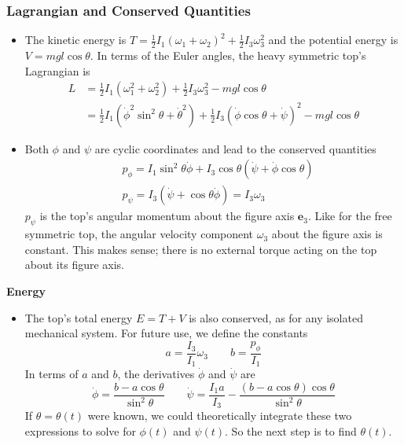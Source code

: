 \documentclass[11pt, a4paper]{article}
\newcommand{\e}{\mathbf{e}} %
\begin{document}
\subsubsection{Lagrangian and Conserved Quantities}
\begin{itemize}
	\item The kinetic energy is $ T = \frac{1}{2}I_1(\omega_1 + \omega_2)^2 + \frac{1}{2}I_3 \omega_3^2 $ and the potential energy is $ V = mgl \cos \theta $. In terms of the Euler angles, the heavy symmetric top's Lagrangian is
	\begin{align*}
		L &= \frac{1}{2}I_1\left (\omega_1^{2} + \omega_2^{2}\right ) + \frac{1}{2}I_3 \omega_3^2  -  mgl \cos \theta\\
		&= \frac{1}{2} I_1\left (\dot{\phi}^2 \sin^2 \theta + \dot{\theta}^2\right ) + \frac{1}{2}I_3 \left (\dot{\phi} \cos \theta + \dot{\psi} \right )^2 -  mgl \cos \theta
	\end{align*}
	
	\item Both $ \phi $ and $ \psi $ are cyclic coordinates and lead to the conserved quantities
	\begin{align*}
		&p_{\phi} = I_1 \sin^{2}\theta \dot{\phi} + I_3 \cos \theta (\dot{\psi} + \dot{\phi} \cos \theta)\\
		&p_{\psi} = I_{3}\left(\dot{\psi} + \cos \theta \dot{\phi} \right) = I_3 \omega_3
	\end{align*}
	$ p_{\psi} $ is the top's angular momentum about the figure axis $ \e_{3} $. Like for the free symmetric top, the angular velocity component $ \omega_3 $  about the figure axis is constant. This makes sense; there is no external torque acting on the top about its figure axis. 
\end{itemize}

\textbf{Energy}
\begin{itemize}
	\item The top's total energy $ E = T + V $ is also conserved, as for any isolated mechanical system. For future use, we define the constants
	\begin{equation*}
		a = \frac{I_3}{I_1}\omega_3 \qquad b = \frac{p_{\phi}}{I_1}
	\end{equation*}
	In terms of $ a $ and $ b $, the derivatives $ \dot{\phi} $ and $ \dot{\psi} $ are
	\begin{equation*}
		\dot \phi = \frac{b-a\cos\theta}{\sin^2 \theta} \qquad \dot \psi = \frac{I_1a}{I_3} - \frac{(b- a\cos\theta)\cos \theta}{\sin^2 \theta}
	\end{equation*}
	If $ \theta = \theta(t) $ were known, we could theoretically integrate these two expressions to solve for $ \phi(t) $ and $ \psi(t) $. So the next step is to find $ \theta(t) $.
\end{itemize}
\end{document}
